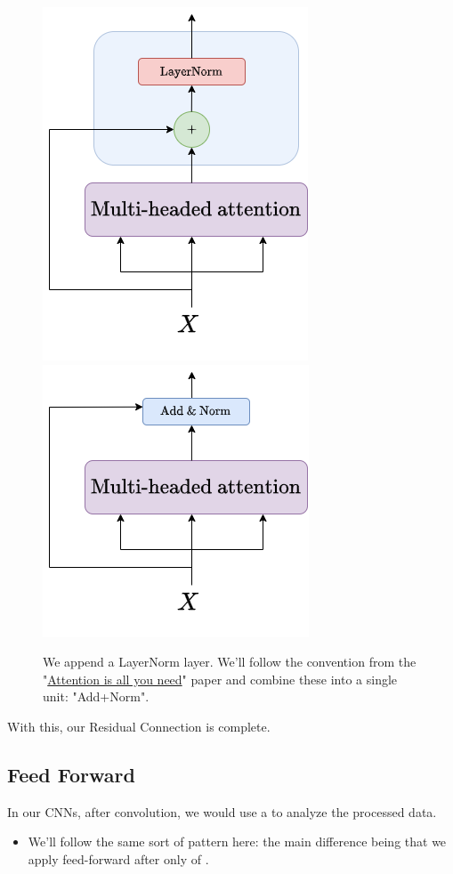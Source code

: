         \begin{figure}[H]
            \centering
            \includegraphics[width=0.3\linewidth]{images/transformers_images/multi_headed_attention_layernorm.png}
            \qquad \qquad
            \includegraphics[width=0.3\linewidth]{images/transformers_images/multi_headed_attention_addnorm.png}
            \caption*{We append a LayerNorm layer. We'll follow the convention from the "\href{https://arxiv.org/pdf/1706.03762.pdf}{Attention is all you need}" paper and combine these into a single unit: "Add+Norm".}
        \end{figure}
        
        With this, our Residual Connection is complete.

    
    \pagebreak


    \subsection{Feed Forward}

        In our CNNs, after convolution, we would use a  to analyze the processed data.

        \begin{itemize}
            \item We'll follow the same sort of pattern here: the main difference being that we apply feed-forward after only  of .\\
        \end{itemize}

